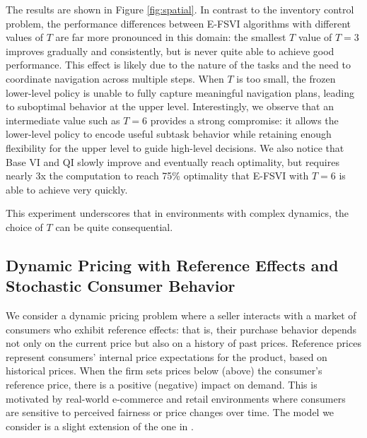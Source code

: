 \documentclass[11pt, notitlepage]{article}
\newcommand{\1}{\mathbbm{1}}
\begin{document}
The results are shown in Figure \ref{fig:spatial}. In contrast to the inventory control problem, the performance differences between E-FSVI algorithms with different values of $T$ are far more pronounced in this domain: the smallest $T$ value of $T = 3$ improves gradually and consistently, but is never quite able to achieve good performance. This effect is likely due to the nature of the tasks and the need to coordinate navigation across multiple steps. When $T$ is too small, the frozen lower-level policy is unable to fully capture meaningful navigation plans, leading to suboptimal behavior at the upper level. Interestingly, we observe that an intermediate value such as $T = 6$ provides a strong compromise: it allows the lower-level policy to encode useful subtask behavior while retaining enough flexibility for the upper level to guide high-level decisions. We also notice that Base VI and QI slowly improve and eventually reach optimality, but requires nearly 3x the computation to reach 75\% optimality that E-FSVI with $T=6$ is able to achieve very quickly.

This experiment underscores that in environments with complex dynamics, the choice of $T$ can be quite consequential.

\subsection{Dynamic Pricing with Reference Effects and Stochastic Consumer Behavior}
We consider a dynamic pricing problem where a seller interacts with a market of consumers who exhibit reference effects: that is, their purchase behavior depends not only on the current price but also on a history of past prices.  Reference prices represent consumers' internal price expectations for the product, based on historical prices. When the firm sets prices below (above) the consumer's reference price, there is a positive (negative) impact on demand. This is motivated by real-world e-commerce and retail environments where consumers are sensitive to perceived fairness or price changes over time. The model we consider is a slight extension of the one in \cite{chen2017efficient}. 
\end{document}
